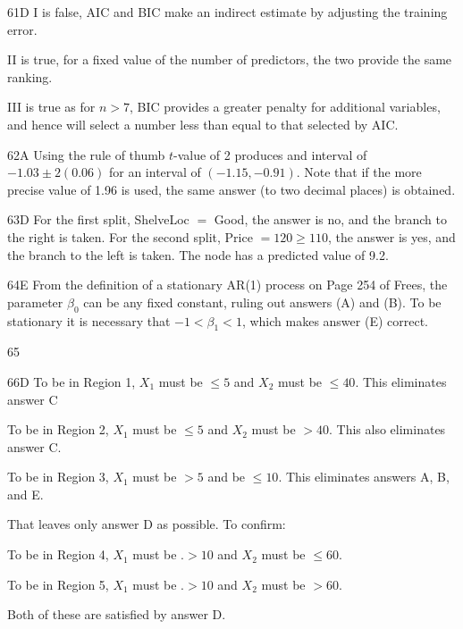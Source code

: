 \begin{solution}{61}{D}
I is false, AIC and BIC make an indirect estimate by adjusting the training error.

II is true, for a fixed value of the number of predictors, the two provide the same ranking.

III is true as for $n > 7$, BIC provides a greater penalty for additional variables, and hence will select a number less than equal to that selected by AIC.
\end{solution}

\begin{solution}{62}{A}
Using the rule of thumb $t$-value of 2 produces and interval of $-1.03 \pm 2(0.06)$ for an interval of $(-1.15, -0.91)$. Note that if the more precise value of 1.96 is used, the same answer (to two decimal places) is obtained.
\end{solution}

\begin{solution}{63}{D}
For the first split, ShelveLoc $=$ Good, the answer is no, and the branch to the right is taken. For the second split, Price $= 120 \geqslant 110$, the answer is yes, and the branch to the left is taken. The node has a predicted value of 9.2.
\end{solution}

\begin{solution}{64}{E}
From the definition of a stationary AR(1) process on Page 254 of Frees, the parameter $\beta_0$ can be any fixed constant, ruling out answers (A) and (B). To be stationary it is necessary that $-1 < \beta_1 < 1$, which makes answer (E) correct.
\end{solution}

\begin{solution}{65}{}
\deleted
\end{solution}

\begin{solution}{66}{D}
To be in Region 1, $X_1$ must be $\leqslant 5$ and $X_2$ must be $\leqslant 40$. This eliminates answer C

To be in Region 2, $X_1$ must be $\leqslant 5$ and $X_2$ must be $> 40$. This also eliminates answer C.

To be in Region 3, $X_1$ must be $> 5$ and be $\leqslant 10$. This eliminates answers A, B, and E.

That leaves only answer D as possible. To confirm:

To be in Region 4, $X_1$ must be .$> 10$ and $X_2$ must be $\leqslant 60$.

To be in Region 5, $X_1$ must be .$> 10$ and $X_2$ must be $> 60$.

Both of these are satisfied by answer D.
\end{solution}


